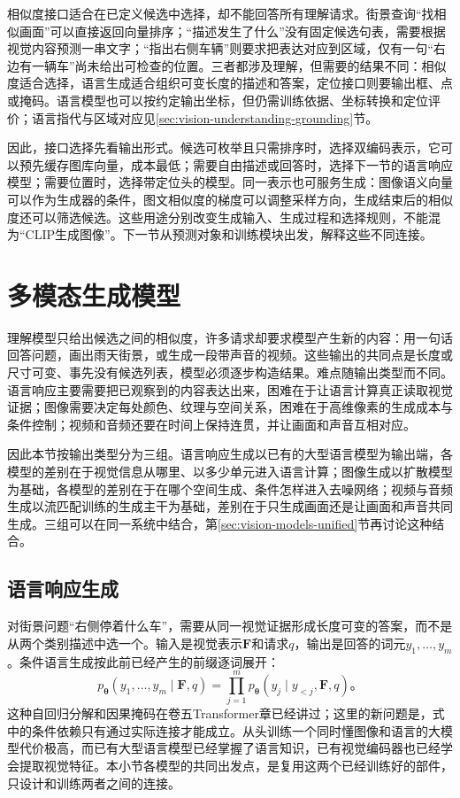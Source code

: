 相似度接口适合在已定义候选中选择，却不能回答所有理解请求。街景查询“找相似画面”可以直接返回向量排序；“描述发生了什么”没有固定候选句表，需要根据视觉内容预测一串文字；“指出右侧车辆”则要求把表达对应到区域，仅有一句“右边有一辆车”尚未给出可检查的位置。三者都涉及理解，但需要的结果不同：相似度适合选择，语言生成适合组织可变长度的描述和答案，定位接口则要输出框、点或掩码。语言模型也可以按约定输出坐标，但仍需训练依据、坐标转换和定位评价；语言指代与区域对应见\ref{sec:vision-understanding-grounding}节。

因此，接口选择先看输出形式。候选可枚举且只需排序时，选择双编码表示，它可以预先缓存图库向量，成本最低；需要自由描述或回答时，选择下一节的语言响应模型；需要位置时，选择带定位头的模型。同一表示也可服务生成：图像语义向量可以作为生成器的条件，图文相似度的梯度可以调整采样方向，生成结束后的相似度还可以筛选候选。这些用途分别改变生成输入、生成过程和选择规则，不能混为“CLIP生成图像”。下一节从预测对象和训练模块出发，解释这些不同连接。

\section{多模态生成模型}
\label{sec:vision-models-generation}

理解模型只给出候选之间的相似度，许多请求却要求模型产生新的内容：用一句话回答问题，画出雨天街景，或生成一段带声音的视频。这些输出的共同点是长度或尺寸可变、事先没有候选列表，模型必须逐步构造结果。难点随输出类型而不同。语言响应主要需要把已观察到的内容表达出来，困难在于让语言计算真正读取视觉证据；图像需要决定每处颜色、纹理与空间关系，困难在于高维像素的生成成本与条件控制；视频和音频还要在时间上保持连贯，并让画面和声音互相对应。

因此本节按输出类型分为三组。语言响应生成以已有的大型语言模型为输出端，各模型的差别在于视觉信息从哪里、以多少单元进入语言计算；图像生成以扩散模型为基础，各模型的差别在于在哪个空间生成、条件怎样进入去噪网络；视频与音频生成以流匹配训练的生成主干为基础，差别在于只生成画面还是让画面和声音共同生成。三组可以在同一系统中结合，第\ref{sec:vision-models-unified}节再讨论这种结合。

\subsection{语言响应生成}
\label{sec:vision-models-language-generation}

对街景问题“右侧停着什么车”，需要从同一视觉证据形成长度可变的答案，而不是从两个类别描述中选一个。输入是视觉表示$\bm{F}$和请求$q$，输出是回答的词元$y_1,\ldots,y_m$。条件语言生成按此前已经产生的前缀逐词展开：
\begin{equation}
  p_{\bm\theta}(y_1,\ldots,y_m\mid\bm F,q)
  =\prod_{j=1}^m p_{\bm\theta}(y_j\mid y_{<j},\bm F,q)\text{。}
  \label{eq:vision-vlm-language}
\end{equation}
这种自回归分解和因果掩码在卷五Transformer章已经讲过；这里的新问题是，式中的条件依赖只有通过实际连接才能成立。从头训练一个同时懂图像和语言的大模型代价极高，而已有大型语言模型已经掌握了语言知识，已有视觉编码器也已经学会提取视觉特征。本小节各模型的共同出发点，是复用这两个已经训练好的部件，只设计和训练两者之间的连接。

